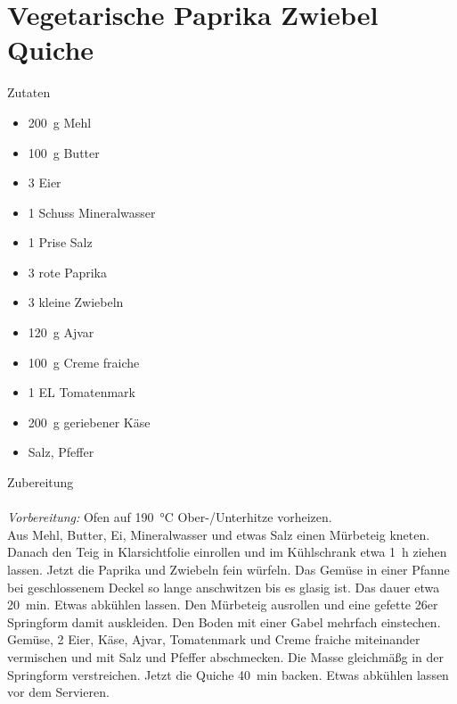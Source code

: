 \section*{Vegetarische Paprika Zwiebel Quiche}
\ihead{}\ohead{}
\cfoot{}
{\Large Zutaten}
\begin{multicols}{2}
\begin{itemize}
    \item \SI{200}{g} Mehl
    \item \SI{100}{g} Butter
    \item \num{3} Eier
    \item \num{1} Schuss Mineralwasser
    \item \num{1} Prise Salz
    \item \num{3} rote Paprika
    \item \num{3} kleine Zwiebeln
    \item \SI{120}{g} Ajvar
    \item \SI{100}{g} Creme fraiche
    \item \num{1} EL Tomatenmark
    \item \SI{200}{g} geriebener Käse
    \item Salz, Pfeffer
\end{itemize}
\end{multicols}
\noindent
{\Large Zubereitung}\\
\\
\textit{Vorbereitung:} Ofen auf \SI{190}{\celsius} Ober-/Unterhitze vorheizen.\\
Aus Mehl, Butter, Ei, Mineralwasser und etwas Salz einen Mürbeteig kneten. 
Danach den Teig in Klarsichtfolie einrollen und im Kühlschrank etwa \SI{1}{h} ziehen lassen.
Jetzt die Paprika und Zwiebeln fein würfeln. 
Das Gemüse in einer Pfanne bei geschlossenem Deckel so lange anschwitzen bis es glasig ist. 
Das dauer etwa \SI{20}{min}. 
Etwas abkühlen lassen. 
Den Mürbeteig ausrollen und eine gefette 26er Springform damit auskleiden. 
Den Boden mit einer Gabel mehrfach einstechen. 
Gemüse, \num{2} Eier, Käse, Ajvar, Tomatenmark und Creme fraiche miteinander vermischen und mit Salz und Pfeffer abschmecken.
Die Masse gleichmäßg in der Springform verstreichen.
Jetzt die Quiche \SI{40}{min} backen.
Etwas abkühlen lassen vor dem Servieren. 
